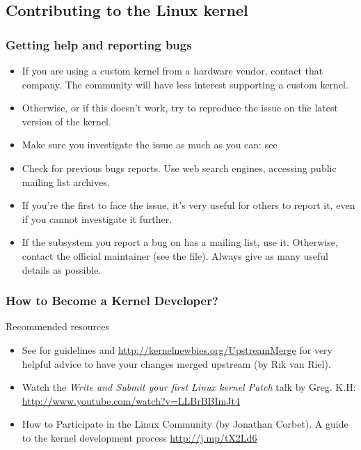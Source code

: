 \subsection{Contributing to the Linux kernel}

\begin{frame}
  \frametitle{Getting help and reporting bugs}
  \begin{itemize}
  \item If you are using a custom kernel from a hardware vendor, contact
        that company. The community will have less interest supporting
        a custom kernel.
  \item Otherwise, or if this doesn't work, try to reproduce the
        issue on the latest version of the kernel. 
  \item Make sure you investigate the issue as much as you can: see
  \item Check for previous bugs reports. Use web search engines,
    accessing public mailing list archives.
  \item If you're the first to face the issue, it's very useful for
    others to report it, even if you cannot investigate it further.
  \item If the subsystem you report a bug on has a mailing list, use
    it. Otherwise, contact the official maintainer (see the
     file). Always give as many useful details as
    possible.
  \end{itemize}
\end{frame}

\begin{frame}
  \frametitle{How to Become a Kernel Developer?}
  Recommended resources
  \begin{itemize}
  \item See  for guidelines
    and \url{http://kernelnewbies.org/UpstreamMerge} for very
    helpful advice to have your changes merged upstream (by Rik van
    Riel).
  \item Watch the \emph{Write and Submit your first Linux kernel
      Patch} talk by Greg. K.H:
    \url{http://www.youtube.com/watch?v=LLBrBBImJt4}
  \item How to Participate in the Linux Community (by Jonathan
    Corbet). A guide to the kernel development process
    \url{http://j.mp/tX2Ld6}
  \end{itemize}
\end{frame}


